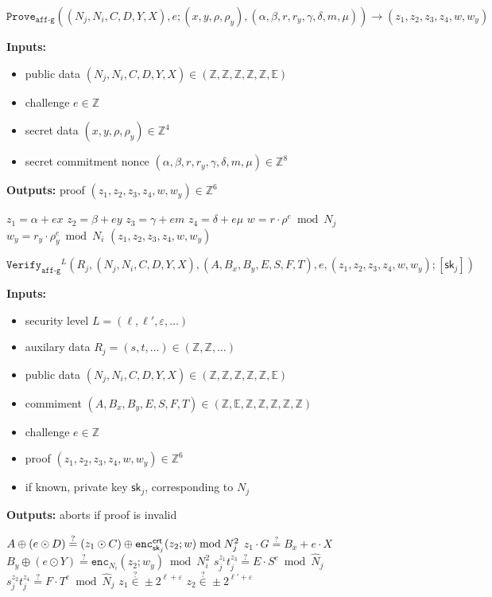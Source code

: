 \documentclass[11pt]{article}
\def\crt{{\sf crt}}
\newenvironment{inlineAlgorithm}{}{}
\newcommand{\algoName}[1]{#1 \par}
\newcommand{\algoInputsList}[1]{
    {\small \bf Inputs:} 
        \begin{itemize}[noitemsep,topsep=0pt]
            #1
        \end{itemize}
}
\newcommand{\algoOutputs}[1]{
    {\small \bf Outputs:} #1 \par
}
\newcommand{\enc}{\ensuremath{\mathtt{enc}}}
\newcommand{\prove}[1]{\ensuremath{\mathtt{Prove}_{\mathtt{#1}}}}
\newcommand{\verify}[1]{\ensuremath{\mathtt{Verify}_{\mathtt{#1}}}}
\newcommand{\sk}{\textsf{sk}}
\newcommand{\E}{\mathbb{E}}
\newcommand{\Z}{\mathbb{Z}}
\newcommand{\?}[1]{\stackrel{?}{#1}}
\begin{document}
\begin{description}
\item
\begin{inlineAlgorithm}
\algoName{$\prove{aff\mbox{-}g}(
    (N_j, N_i, C, D, Y, X),
    e;
    (x, y, \rho, \rho_y),
    (\alpha, \beta, r, r_y, \gamma, \delta, m, \mu)
) \to (z_1, z_2, z_3, z_4, w, w_y)$}
\algoInputsList{
    \item public data $(N_j, N_i, C, D, Y, X) \in (\Z, \Z, \Z, \Z, \Z, \E)$
    \item challenge $e \in \Z$
    \item secret data $(x, y, \rho, \rho_y) \in \Z^4$
    \item secret commitment nonce $(\alpha, \beta, r, r_y, \gamma, \delta, m, \mu) \in \Z^8$
}
\algoOutputs{proof $(z_1, z_2, z_3, z_4, w, w_y) \in \Z^6$}
\begin{algorithmic}[1]
\State $z_1 = \alpha + e x$
\State $z_2 = \beta + e y$
\State $z_3 = \gamma + e m$
\State $z_4 = \delta + e \mu$
\State $w = r \cdot \rho^e \bmod N_j$
\State $w_y = r_y \cdot \rho_y^e \bmod N_i$
\State \Return $(z_1, z_2, z_3, z_4, w, w_y)$
\end{algorithmic}
\end{inlineAlgorithm}

\item
\begin{inlineAlgorithm}
\algoName{$\verify{aff\mbox{-}g}^L(
    R_j,
    (N_j, N_i, C, D, Y, X),
    (A, B_x, B_y, E, S, F, T),
    e,
    (z_1, z_2, z_3, z_4, w, w_y);
    [\sk_j]
)$}
\algoInputsList{
    \item security level $L = (\ell, \ell', \varepsilon, \dots)$
    \item auxilary data $R_j = (s, t, \dots) \in (\Z, \Z, \dots)$
    \item public data $(N_j, N_i, C, D, Y, X) \in (\Z, \Z, \Z, \Z, \Z, \E)$
    \item commiment $(A, B_x, B_y, E, S, F, T) \in (\Z, \E, \Z, \Z, \Z, \Z, \Z)$
    \item challenge $e \in \Z$
    \item proof $(z_1, z_2, z_3, z_4, w, w_y) \in \Z^6$
    \item if known, private key $\sk_j$, corresponding to $N_j$
}
\algoOutputs{aborts if proof is invalid}
\begin{algorithmic}[1]
\State $A \oplus (e \odot D) \? = (z_1 \odot C) \oplus \enc^\crt_{\sk_j}(z_2; w)\bmod N_j^2$
\State $z_1 \cdot G \? = B_x + e \cdot X$
\State $B_y \oplus (e \odot Y) \? = \enc_{N_i}(z_2; w_y) \bmod N_i^2$
\State $s_j^{z_1} t_j^{z_3} \? = E \cdot S^e \bmod \hat N_j$
\State $s_j^{z_2} t_j^{z_4} \? = F \cdot T^e \bmod \hat N_j$
\State $z_1 \? \in \pm 2^{\ell + \varepsilon}$
\State $z_2 \? \in \pm 2^{\ell' + \varepsilon}$
\end{algorithmic}
\end{inlineAlgorithm}

\end{description}
\end{document}
